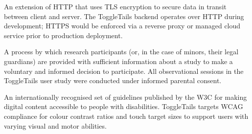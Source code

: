 \begin{description}[leftmargin=2.5cm, style=nextline]

\item[\textbf{HTTPS (Hypertext Transfer Protocol Secure)}]
An extension of HTTP that uses TLS encryption to secure data in transit
between client and server. The ToggleTails backend operates over HTTP during
development; HTTPS would be enforced via a reverse proxy or managed cloud
service prior to production deployment.

\item[\textbf{Informed Consent}]
A process by which research participants (or, in the case of minors, their
legal guardians) are provided with sufficient information about a study to
make a voluntary and informed decision to participate. All observational
sessions in the ToggleTails user study were conducted under informed parental
consent.

\item[\textbf{WCAG (Web Content Accessibility Guidelines)}]
An internationally recognised set of guidelines published by the W3C for
making digital content accessible to people with disabilities. ToggleTails
targets WCAG compliance for colour contrast ratios and touch target sizes to
support users with varying visual and motor abilities.

\end{description}
